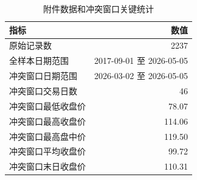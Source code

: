 \begin{table}[!htbp]
\centering
\caption{附件数据和冲突窗口关键统计}
\begin{tabular}{lr}
\toprule
指标 & 数值 \\
\midrule
原始记录数 & 2237 \\
全样本日期范围 & 2017-09-01 至 2026-05-05 \\
冲突窗口日期范围 & 2026-03-02 至 2026-05-05 \\
冲突窗口交易日数 & 46 \\
冲突窗口最低收盘价 & 78.07 \\
冲突窗口最高收盘价 & 114.06 \\
冲突窗口最高盘中价 & 119.50 \\
冲突窗口平均收盘价 & 99.72 \\
冲突窗口末日收盘价 & 110.31 \\
\bottomrule
\end{tabular}
\end{table}
